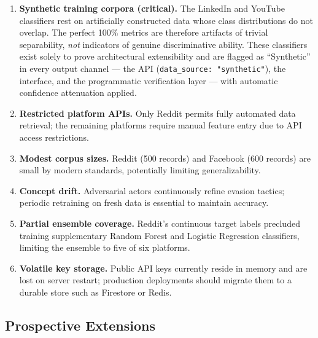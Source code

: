 \documentclass[conference]{IEEEtran}
\begin{document}
\begin{enumerate}
    \item \textbf{Synthetic training corpora (critical).} The LinkedIn and YouTube classifiers rest on artificially constructed data whose class distributions do not overlap. The perfect 100\% metrics are therefore artifacts of trivial separability, \textit{not} indicators of genuine discriminative ability. These classifiers exist solely to prove architectural extensibility and are flagged as ``Synthetic'' in every output channel --- the API (\texttt{data\_source: "synthetic"}), the interface, and the programmatic verification layer --- with automatic confidence attenuation applied.
    \item \textbf{Restricted platform APIs.} Only Reddit permits fully automated data retrieval; the remaining platforms require manual feature entry due to API access restrictions.
    \item \textbf{Modest corpus sizes.} Reddit (500 records) and Facebook (600 records) are small by modern standards, potentially limiting generalizability.
    \item \textbf{Concept drift.} Adversarial actors continuously refine evasion tactics; periodic retraining on fresh data is essential to maintain accuracy.
    \item \textbf{Partial ensemble coverage.} Reddit's continuous target labels precluded training supplementary Random Forest and Logistic Regression classifiers, limiting the ensemble to five of six platforms.
    \item \textbf{Volatile key storage.} Public API keys currently reside in memory and are lost on server restart; production deployments should migrate them to a durable store such as Firestore or Redis.
\end{enumerate}

\subsection{Prospective Extensions}
\end{document}
